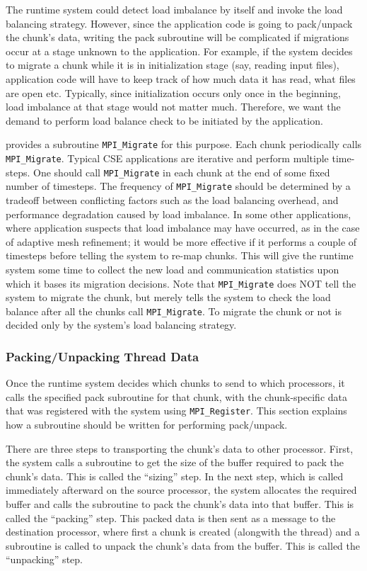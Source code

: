 \documentclass[10pt]{article}
\begin{document}
The \ampi{} runtime system could detect load imbalance by itself and invoke the
load balancing strategy. However, since the application code is going to
pack/unpack the chunk's data, writing the pack subroutine will be complicated
if migrations occur at a stage unknown to the application. For example, if the
system decides to migrate a chunk while it is in initialization stage (say,
reading input files), application code will have to keep track of how much data
it has read, what files are open etc. Typically, since initialization occurs
only once in the beginning, load imbalance at that stage would not matter much.
Therefore, we want the demand to perform load balance check to be initiated by
the application.

\ampi{} provides a subroutine \texttt{MPI\_Migrate} for this purpose. Each
chunk periodically calls \texttt{MPI\_Migrate}. Typical CSE applications are
iterative and perform multiple time-steps. One should call
\texttt{MPI\_Migrate} in each chunk at the end of some fixed number of
timesteps. The frequency of \texttt{MPI\_Migrate} should be determined by a
tradeoff between conflicting factors such as the load balancing overhead, and
performance degradation caused by load imbalance. In some other applications,
where application suspects that load imbalance may have occurred, as in the
case of adaptive mesh refinement; it would be more effective if it performs a
couple of timesteps before telling the system to re-map chunks. This will give
the \ampi{} runtime system some time to collect the new load and communication
statistics upon which it bases its migration decisions. Note that
\texttt{MPI\_Migrate} does NOT tell the system to migrate the chunk, but
merely tells the system to check the load balance after all the chunks call
\texttt{MPI\_Migrate}. To migrate the chunk or not is decided only by the
system's load balancing strategy.

\subsubsection{Packing/Unpacking Thread Data}

Once the \ampi{} runtime system decides which chunks to send to which
processors, it calls the specified pack subroutine for that chunk, with the
chunk-specific data that was registered with the system using
\texttt{MPI\_Register}. This section explains how a subroutine should be
written for performing pack/unpack.

There are three steps to transporting the chunk's data to other processor.
First, the system calls a subroutine to get the size of the buffer required to
pack the chunk's data. This is called the ``sizing'' step. In the next step,
which is called immediately afterward on the source processor, the system
allocates the required buffer and calls the subroutine to pack the chunk's data
into that buffer. This is called the ``packing'' step. This packed data is then
sent as a message to the destination processor, where first a chunk is created
(alongwith the thread) and a subroutine is called to unpack the chunk's data
from the buffer. This is called the ``unpacking'' step.
\end{document}
